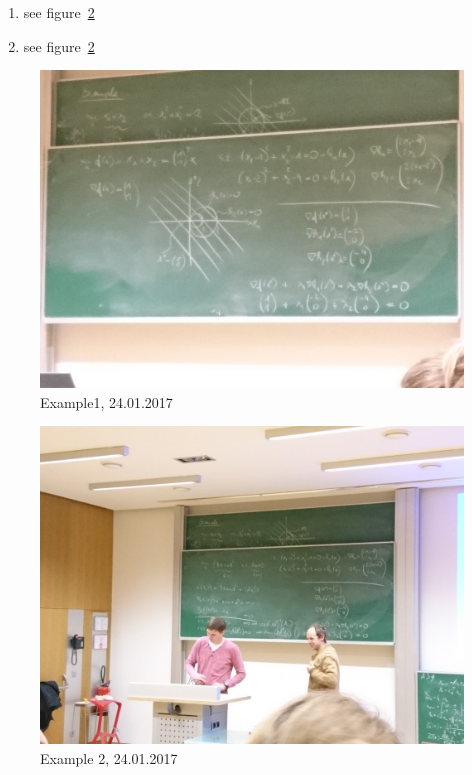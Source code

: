 \documentclass{report}
\begin{document}
\begin{enumerate}
\item see figure~\ref{fig:ex2}

\item see figure~\ref{fig:ex2}


\end{enumerate}
\begin{figure}[H]
\includegraphics[width=\textwidth]{2017_01_24-ex1.jpg}
\caption{Example1,  24.01.2017\label{fig:ex1}}
\end{figure}

\begin{figure}[H]
\includegraphics[width=\textwidth]{2017_01_24-ex2.jpg}
\caption{Example 2,  24.01.2017\label{fig:ex2}}
\end{figure}
\end{document}
